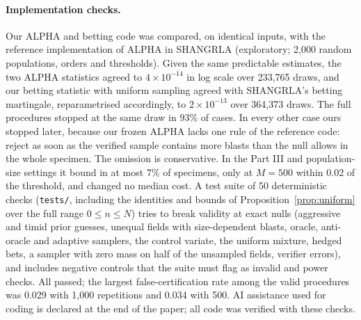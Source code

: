 \documentclass[11pt]{article}
\theoremstyle{remark}
\theoremstyle{definition}
\begin{document}
\paragraph{Implementation checks.} Our ALPHA and betting code was compared, on identical inputs, with the reference implementation of ALPHA in SHANGRLA \cite{stark2023alpha} (exploratory; 2,000 random populations, orders and thresholds). Given the same predictable estimates, the two ALPHA statistics agreed to $4\times10^{-14}$ in log scale over 233,765 draws, and our betting statistic with uniform sampling agreed with SHANGRLA's betting martingale, reparametrised accordingly, to $2\times10^{-13}$ over 364,373 draws. The full procedures stopped at the same draw in 93\% of cases. In every other case ours stopped later, because our frozen ALPHA lacks one rule of the reference code: reject as soon as the verified sample contains more blasts than the null allows in the whole specimen. The omission is conservative. In the Part III and population-size settings it bound in at most 7\% of specimens, only at $M=500$ within 0.02 of the threshold, and changed no median cost. A test suite of 50 deterministic checks (\texttt{tests/}, including the identities and bounds of Proposition~\ref{prop:uniform} over the full range $0\le n\le N$) tries to break validity at exact nulls (aggressive and timid prior guesses, unequal fields with size-dependent blasts, oracle, anti-oracle and adaptive samplers, the control variate, the uniform mixture, hedged bets, a sampler with zero mass on half of the unsampled fields, verifier errors), and includes negative controls that the suite must flag as invalid and power checks. All passed; the largest false-certification rate among the valid procedures was 0.029 with 1,000 repetitions and 0.034 with 500. AI assistance used for coding is declared at the end of the paper; all code was verified with these checks.
\end{document}
